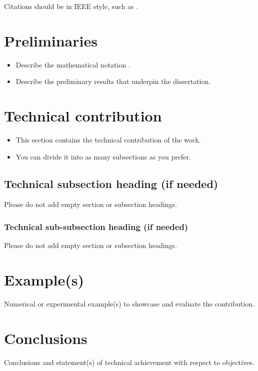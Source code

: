 Citations should be in IEEE style, such as \cite{zhao2025roboticdrilling}.


\section{Preliminaries}
\begin{itemize}
    \item Describe the mathematical notation \cite{Vivaldi2014}.
    \item Describe the preliminary results that underpin the dissertation.
\end{itemize}
  

\section{Technical contribution}
\begin{itemize}
    \item This section contains the technical contribution of the work.
    \item You can divide it into as many subsections as you prefer.
\end{itemize}

\subsection{Technical subsection heading (if needed)}
Please do not add empty section or subsection headings.

\subsubsection{Technical sub-subsection heading (if needed)}
Please do not add empty section or subsection headings.


\section{Example(s)}
Numerical or experimental example(s) to showcase and evaluate the contribution.


\section{Conclusions}
Conclusions and statement(s) of technical achievement with respect to objectives.

